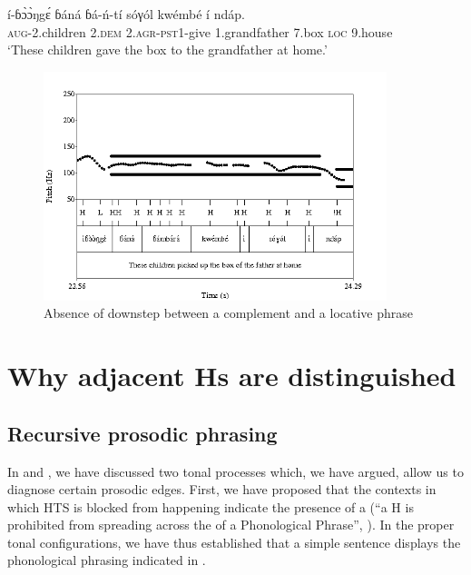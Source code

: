 \documentclass[output=paper,newtxmath,modfonts,nonflat,hidelinks]{langsci/langscibook}
\begin{document}
\ea \gll í-ɓ\`ɔ\`ɔŋg\'ɛ ɓ{á}n{á} ɓ{á}-ń-tí sóγól {\↓}kwémbé í {\↓}nd{á}p.\\
\textsc{aug}-2.children 2.\textsc{dem} 2.\textsc{agr}-\textsc{pst1}-give 1.grandfather 7.box \textsc{loc} 9.house\\
\glt `These children gave the box to the grandfather at home.'\label{ex:HamlaouiMakasso:16}
\z


\begin{figure}[t]

\caption{Absence of downstep between a complement and a locative phrase  \label{fig:HamlaouiMakasso:6}}
\includegraphics[width=10cm]{figures/LocSept16B}

\end{figure}


\section{Why adjacent Hs are distinguished}\label{sec:HamlaouiMakasso:4} 

\subsection{Recursive prosodic phrasing}

In \citet{HamlaouiEtAl14} and \citet{HamlaouiSzendroi15, HamlaouiSzendroi16}, we have discussed two tonal processes which, we have argued, allow us to diagnose certain prosodic edges. First, we have proposed that the contexts in which HTS is blocked from happening indicate the presence of a   (``a H  is prohibited from spreading across the  of a Phonological Phrase'', \citealt[27]{HamlaouiEtAl14}). In the proper tonal configurations, we have thus established that a simple sentence displays the phonological phrasing indicated in .
\end{document}

